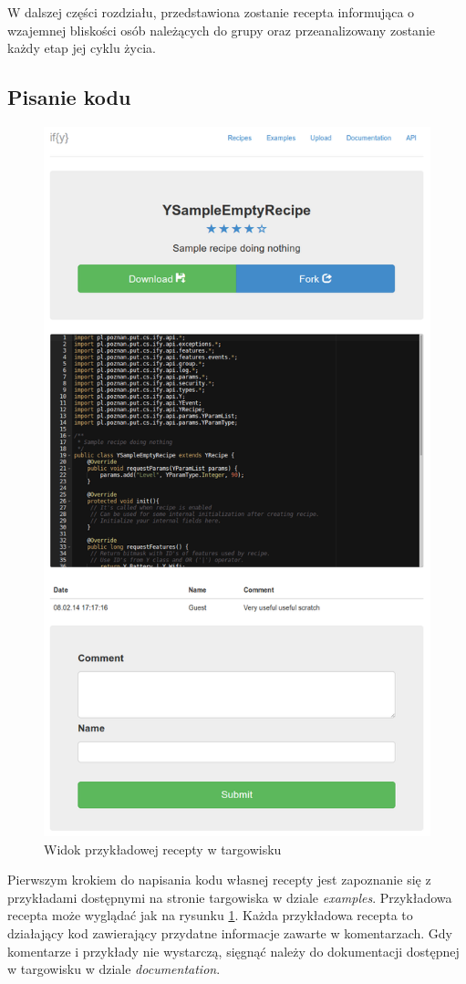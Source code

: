 \documentclass[11pt,a4paper,polish,thesis]{dcsbook}
\begin{document}
W dalszej części rozdziału, przedstawiona zostanie recepta informująca o wzajemnej bliskości osób należących do grupy oraz przeanalizowany zostanie każdy etap
jej cyklu życia.
\subsection{Pisanie kodu}
\begin{figure}[H]
  \centering
  \includegraphics[scale=0.4]{./resources/market_recipe.png}
  \caption{Widok przykładowej recepty w targowisku}
  \label{fig:market_recipe}
\end{figure}
Pierwszym krokiem do napisania kodu własnej recepty jest zapoznanie się z przykładami dostępnymi na stronie targowiska w dziale \emph{examples}. Przykładowa recepta
może wyglądać jak na rysunku \ref{fig:market_recipe}. Każda przykładowa recepta to działający kod zawierający przydatne informacje zawarte w komentarzach. Gdy komentarze i przykłady nie wystarczą, sięgnąć należy do dokumentacji dostępnej w targowisku w dziale \emph{documentation}.
\end{document}
